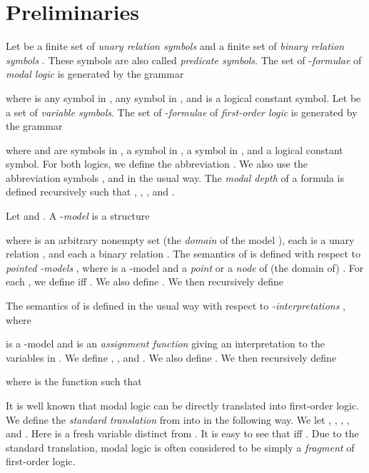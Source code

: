 \documentclass[copyright,creativecommons]{eptcs}
\begin{document}
\section{Preliminaries}\label{preliminaries}








Let  be a finite  set of
\emph{unary relation symbols}  and  a finite set of
\emph{binary relation symbols} . These symbols are also called
\emph{predicate symbols}. 
The set of -\emph{formulae} of \emph{modal logic} 
is generated by the grammar

where  is any symbol in ,   any symbol in , and  is a logical constant  symbol.
Let  
be a set of \emph{variable symbols}. 
The set of -\emph{formulae} of \emph{first-order logic}  
is generated by the grammar

where  and  are symbols in ,
 a symbol in ,   a symbol in , and  a logical constant  symbol.
For both logics, we define the abbreviation . We also
use the abbreviation symbols ,  and  in the usual way.
The \emph{modal depth}  of a formula is defined recursively such that
, ,
, and
.




Let  and .
A -\emph{model} 
is a structure

where  is an arbitrary nonempty set (the \emph{domain}
of the model ), 
each  is a unary relation , and
each  a binary relation .
The semantics of  is defined
with respect to \emph{pointed -models}
, where 
is a -model and  a \emph{point} or a \emph{node} of (the
domain of) .
For each , we define  iff . We also define .
We then recursively define

The semantics of  is defined
in the usual way with respect to \emph{-interpretations}
, where

is a -model and  is an \emph{assignment function}
 giving an interpretation to the variables in .
We define , ,
and . We also define .
We then recursively define

where  is the function  such that

It is well known that modal logic can be directly translated into first-order logic.
We define the \emph{standard translation} from  into  in
the following way. We let , ,
,
, and .
Here  is a fresh variable distinct from .
It is easy to see that  iff
. 
Due to the standard translation, modal logic is often 
considered to be simply a \emph{fragment} of first-order logic.
\end{document}
